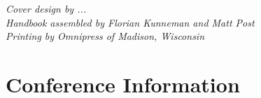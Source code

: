 \documentclass[twoside,makeidx]{book}
\begin{document}


\fancyfoot[C]{}





\cleardoublepage
\thispagestyle{empty}
\vspace*{6in}
\noindent\emph{Cover design by ...}\\\index{}
\noindent\emph{Handbook assembled by Florian Kunneman and Matt Post}\\
\emph{Printing by Omnipress of Madison, Wisconsin}

\newpage
\cleardoublepage
\fancyfoot[C]{\thepage}
\frontmatter





\setcounter{tocdepth}{2}
\tableofcontents
\mainmatter
\pagestyle{fancy}


\clearpage
\setheaders{}{}
%


\chapter{Conference Information}


\clearpage


\clearpage%
\setheaders{}{}


%
\clearpage%
\setheaders{}{}
\end{document}
